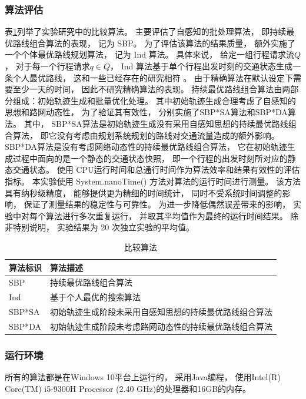 \subsubsection*{算法评估}



表\ref{route_tab:compared_alg}列举了实验研究中的比较算法。
主要评估了自感知的批处理算法， 即持续最优路线组合算法的表现， 记为 SBP。 为了评估该算法的结果质量， 额外实施了一个个体最优路线规划算法， 记为 Ind 算法。 具体来说， 给定一组行程请求流$Q$， 对于每一个行程请求$q \in Q$， Ind 算法基于单个行程出发时刻的交通状态生成一条个人最优路线， 这和一些已经存在的研究相符 。 由于精确算法在默认设定下需要至少一天的时间， 因此不研究精确算法的表现。 持续最优路线组合算法由两部分组成：初始轨迹生成和批量优化处理。 其中初始轨迹生成合理考虑了自感知的思想和路网动态性， 为了验证其有效性， 分别实施了SBP*SA算法和SBP*DA算法。 其中， SBP*SA算法是初始轨迹生成没有采用自感知思想的持续最优路线组合算法， 即它没有考虑由规划系统规划的路线对交通流量造成的额外影响。 SBP*DA算法是没有考虑网络动态性的持续最优路线组合算法， 它在初始轨迹生成过程中面向的是一个静态的交通状态快照， 即一个行程的出发时刻所对应的静态交通状态。 使用 CPU运行时间和总通行时间作为算法效率和结果有效性的评估指标。 本实验使用 System.nanoTime() 方法对算法的运行时间进行测量。 该方法具有纳秒级精度， 能够提供更为精细的时间统计， 同时不受系统时间调整的影响， 保证了测量结果的稳定性与可靠性。 为进一步降低偶然误差带来的影响， 实验中对每个算法进行多次重复运行， 并取其平均值作为最终的运行时间结果。 除非特别说明， 实验结果为 20 次独立实验的平均值。
\begin{table}[!h]
    \caption{比较算法}\label{route_tab:compared_alg}
    \begin{tabular}{ll}
        \toprule
		\textbf{算法标识} &  \textbf{算法描述} \\
        \midrule
        SBP & 持续最优路线组合算法\\
        Ind & 基于个人最优的搜索算法 \\
        SBP*SA & 初始轨迹生成阶段未采用自感知思想的持续最优路线组合算法 \\
        SBP*DA & 初始轨迹生成阶段未考虑路网动态性的持续最优路线组合算法 \\
        \bottomrule
    \end{tabular}
\end{table}
\subsubsection*{运行环境}
所有的算法都是在Windows 10平台上运行的， 采用Java编程， 使用Intel(R) Core(TM) i5-9300H Processor (2.40 GHz)的处理器和16GB的内存。

